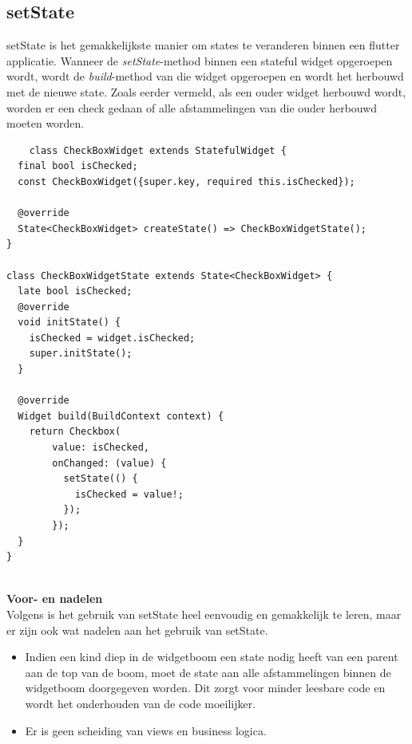 \subsection{{setState}}%
\label{sec:setState}
setState is het gemakkelijkste manier om states te veranderen binnen een flutter applicatie. Wanneer de \textit{setState}-method binnen een stateful widget opgeroepen wordt, 
wordt de \textit{build}-method van die widget opgeroepen en wordt het herbouwd met de nieuwe state. Zoals eerder vermeld, als een ouder widget herbouwd wordt, worden er een check gedaan of alle afstammelingen van die ouder herbouwd moeten worden. 
\\
\begin{verbatim} 
    class CheckBoxWidget extends StatefulWidget {
  final bool isChecked;
  const CheckBoxWidget({super.key, required this.isChecked});

  @override
  State<CheckBoxWidget> createState() => CheckBoxWidgetState();
}

class CheckBoxWidgetState extends State<CheckBoxWidget> {
  late bool isChecked;
  @override
  void initState() {
    isChecked = widget.isChecked;
    super.initState();
  }

  @override
  Widget build(BuildContext context) {
    return Checkbox(
        value: isChecked,
        onChanged: (value) {
          setState(() {
            isChecked = value!;
          });
        });
  }
}
\end{verbatim}
\hfill
\\
\textbf{Voor- en nadelen}
\\
Volgens \textcite{slep2020} is het gebruik van setState heel eenvoudig en gemakkelijk te leren, maar er zijn ook wat nadelen aan het gebruik van setState.
\begin{itemize}
    \item Indien een kind diep in de widgetboom een state nodig heeft van een parent aan de top van de boom, moet de state aan alle afstammelingen binnen de widgetboom doorgegeven worden. Dit zorgt voor minder leesbare code en wordt het onderhouden van de code moeilijker.
    \item Er is geen scheiding van views en business logica.
\end{itemize}






